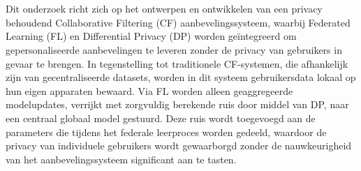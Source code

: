 
%
%
%
%
%

%



\chapter*{}
Dit onderzoek richt zich op het ontwerpen en ontwikkelen van een privacy behoudend Collaborative Filtering (CF) aanbevelingssysteem, waarbij Federated Learning (FL) en Differential Privacy (DP) worden geïntegreerd om gepersonaliseerde aanbevelingen te leveren zonder de privacy van gebruikers in gevaar te brengen. In tegenstelling tot traditionele CF-systemen, die afhankelijk zijn van gecentraliseerde datasets, worden in dit systeem gebruikersdata lokaal op hun eigen apparaten bewaard. Via FL worden alleen geaggregeerde modelupdates, verrijkt met zorgvuldig berekende ruis door middel van DP, naar een centraal globaal model gestuurd. Deze ruis wordt toegevoegd aan de parameters die tijdens het federale leerproces worden gedeeld, waardoor de privacy van individuele gebruikers wordt gewaarborgd zonder de nauwkeurigheid van het aanbevelingssysteem significant aan te tasten.

